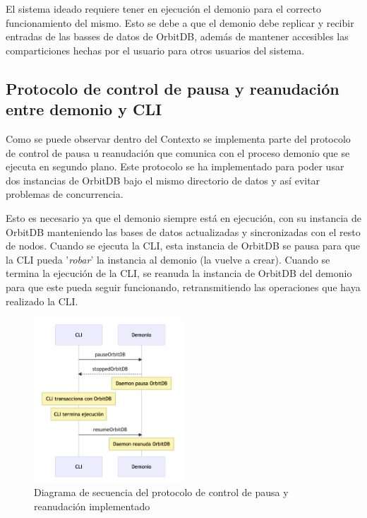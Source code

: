 El sistema ideado requiere tener en ejecución el demonio para el correcto funcionamiento del mismo. Esto se debe a que el demonio
debe replicar y recibir entradas de las basses de datos de OrbitDB, además de mantener accesibles las comparticiones hechas
por el usuario para otros usuarios del sistema.

\subsection{Protocolo de control de pausa y reanudación entre demonio y CLI}

Como se puede observar dentro del Contexto se implementa parte del protocolo de control de pausa u reanudación
que comunica con el proceso demonio que se ejecuta en segundo plano. Este protocolo se ha implementado
para poder usar dos instancias de OrbitDB bajo el mismo directorio de datos y así evitar problemas de concurrencia.

Esto es necesario ya que el demonio siempre está en ejecución, con su instancia de OrbitDB manteniendo las
bases de datos actualizadas y sincronizadas con el resto de nodos. Cuando se ejecuta la CLI, esta instancia de OrbitDB se pausa para que la CLI pueda
'\textit{robar}' la instancia al demonio (la vuelve a crear). Cuando se termina la ejecución de la CLI, se reanuda la instancia de OrbitDB del demonio para que este pueda seguir funcionando, retransmitiendo las operaciones que haya realizado la CLI.

\begin{figure}[H]
  \centering
  \includegraphics[width=0.5\textwidth]{images/control_pausa_reanudacion.png}
  \caption{Diagrama de secuencia del protocolo de control de pausa y reanudación implementado}
  \label{fig:control_pausa_reanudacion}
\end{figure}

